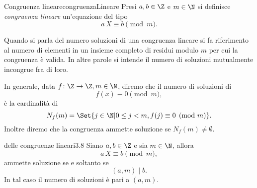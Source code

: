 \begin{defn}{Congruenza lineare}{congruenzaLineare}
	Presi \(a,b\in\Z\) e \(m\in\N\) si definisce \emph{congruenza lineare} un'equazione del tipo
	\[
		a\,X \equiv b \pmod{m}.
	\]
\end{defn}

\begin{oss}
	Quando si parla del numero soluzioni di una congruenza lineare si fa riferimento al numero di elementi in un insieme completo di residui modulo \(m\) per cui la congruenza è valida.
	In altre parole si intende il numero di soluzioni mutualmente incongrue fra di loro.
\end{oss}

\begin{notz}
	In generale, data \(f\colon \Z \to \Z, m\in\N\), diremo che il numero di soluzioni di
	\[
		f(x) \equiv 0 \pmod{m},
	\]
	è la cardinalità di
	\[
		N_f(m) = \Set{j\in\N | 0 \le j < m, f(j) \equiv 0 \pmod{m}}.
	\]
	Inoltre diremo che la congruenza ammette soluzione se \(N_f(m) \neq \emptyset\).
\end{notz}

\begin{teor}{delle congruenze lineari}{3.8}
	Siano \(a,b\in\Z\) e sia \(m\in\N\), allora
	\[
		a\, X \equiv b \pmod{m},
	\]
	ammette soluzione se e soltanto se
	\[
		(a,m) \mid b.
	\]
	In tal caso il numero di soluzioni è pari a \((a,m)\).
\end{teor}

